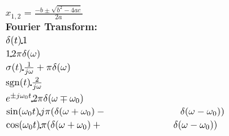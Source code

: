 \begin{landscape}
\begin{minipage}{0.2\linewidth}
$x_{1,2}=\frac{-b\pm \sqrt{b^2-4ac}}{2a}$\\

\textbf{Fourier Transform:}\\

$\delta(t)\FT 1$\\
$1\FT 2\pi \delta(\omega)$\\
$\sigma(t)\FT \frac{1}{j\omega}+\pi\delta(\omega)$\\
$\text{sgn}(t)\FT \frac{2}{j\omega}$\\
$e^{\pm j \omega_0 t} \FT 2\pi \delta(\omega \mp \omega_0)$\\
$\sin(\omega_0t)\FT j\pi(\delta(\omega +\omega_0)-\newline\text{\hspace{2.7cm}}\delta(\omega -\omega_0))$\\
$\cos(\omega_0t)\FT \pi(\delta(\omega +\omega_0)+\newline\text{\hspace{2.6cm}}\delta(\omega -\omega_0))$\\
\end{minipage}


 


\end{landscape}